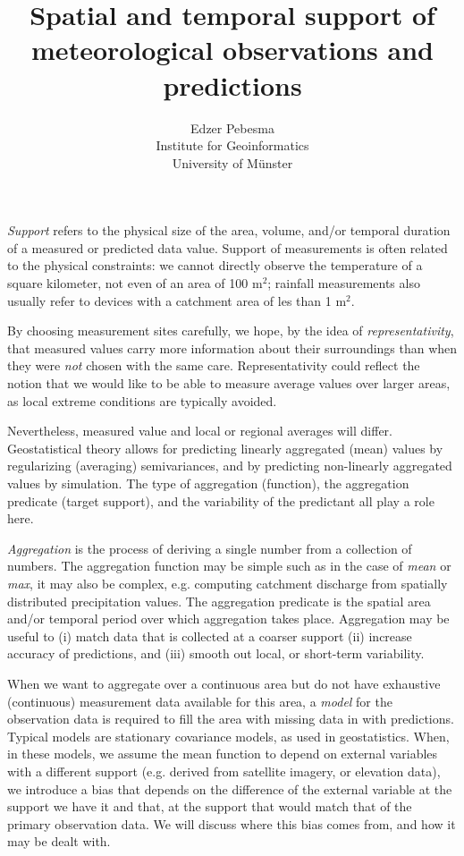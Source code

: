 \documentclass{article}
\title{\bf Spatial and temporal support of meteorological observations and predictions}
\author{Edzer Pebesma \\ Institute for Geoinformatics \\ University of Münster }
\begin{document}
\maketitle

{\em Support} refers to the physical size of the area, volume,
and/or temporal duration of a measured or predicted data value.
Support of measurements is often related to the physical constraints:
we cannot directly observe the temperature of a square kilometer,
not even of an area of 100 m$^2$; rainfall measurements also usually
refer to devices with a catchment area of les than 1 m$^2$.

By choosing measurement sites carefully, we hope, by the idea of
{\em representativity}, that measured values carry more information
about their surroundings than when they were {\em not} chosen with
the same care. Representativity could reflect the notion that we
would like to be able to measure average values over larger areas,
as local extreme conditions are typically avoided.

Nevertheless, measured value and local or regional averages
will differ. Geostatistical theory allows for predicting linearly
aggregated (mean) values by regularizing (averaging) semivariances,
and by predicting non-linearly aggregated values by simulation. The
type of aggregation (function), the aggregation predicate (target
support), and the variability of the predictant all play a role here.

{\em Aggregation} is the process of deriving a single number from a
collection of numbers. The aggregation function may be simple such
as in the case of {\em mean} or {\em max}, it may also be complex,
e.g. computing catchment discharge from spatially distributed
precipitation values. The aggregation predicate is the
spatial area and/or temporal period over which aggregation takes
place. Aggregation may be useful to (i) match data that is collected
at a coarser support (ii) increase accuracy of predictions, and
(iii) smooth out local, or short-term variability.

When we want to aggregate over a continuous area but do not have
exhaustive (continuous) measurement data available for this area,
a {\em model} for the observation data is required to fill the area
with missing data in with predictions. Typical models are stationary
covariance models, as used in geostatistics. When, in these models,
we assume the mean function to depend on external variables with a
different support (e.g. derived from satellite imagery, or elevation
data), we introduce a bias that depends on the difference of the
external variable at the support we have it and that, at the support
that would match that of the primary observation data. We will
discuss where this bias comes from, and how it may be dealt with.
\end{document}
